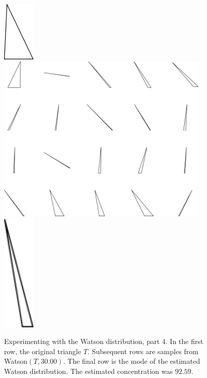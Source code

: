 \begin{figure}
\includegraphics[width=0.6in]{output/1.models/test_watson/watson_4_true.png}\\ 
\includegraphics[width=4in]{output/1.models/test_watson/watson_4_samples.png}\\ 
\includegraphics[width=0.6in]{output/1.models/test_watson/watson_4_est.png}
\caption{Experimenting with the Watson distribution, part 4. In the first row, the original triangle $T$. Subsequent rows are samples from Watson$(T,30.00)$. The final row is the mode of the estimated Watson distribution. The estimated concentration was $92.59$.}
\label{fig-watson-4}
\end{figure}

